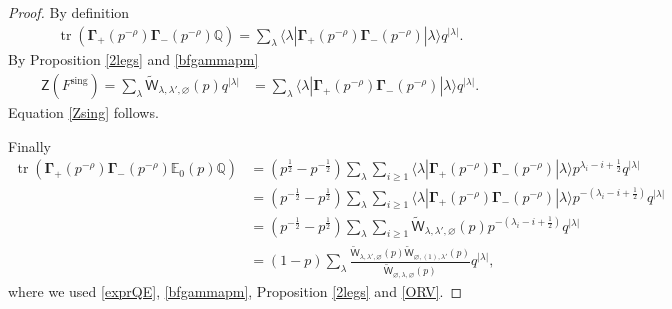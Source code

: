 \documentclass{amsart}
\theoremstyle{definition}
\newcommand{\QQ} {\mathbb{Q}}		%
\newcommand{\bfGamma} {\mathbf{\Gamma}}
\newcommand{\sing}{\mathrm{sing}}
\newcommand{\EE}{\mathbb{E}}
\newcommand{\sfW} {\mathsf{W}}
\newcommand{\sfZ} {\mathsf{Z}}
\newcommand{\tr}{\operatorname{tr}}
\begin{document}
\begin{proof}
By definition
\begin{align*}
\tr(\bfGamma_+(p^{-\rho}) \bfGamma_-(p^{-\rho}) \QQ) = \sum_\lambda \langle \lambda | \mathbf{\Gamma}_+(p^{-\rho}) \mathbf{\Gamma}_-(p^{-\rho}) | \lambda \rangle q^{|\lambda|}.
\end{align*}
By Proposition \ref{2legs} and \eqref{bfgammapm}
\begin{align*}
\sfZ(F^{\sing}) = \sum_\lambda \tilde{\sfW}_{\lambda,\lambda',\varnothing}(p) q^{|\lambda|} &= \sum_\lambda \langle \lambda | \mathbf{\Gamma}_+(p^{-\rho}) \mathbf{\Gamma}_-(p^{-\rho}) | \lambda \rangle q^{|\lambda|}.  %
\end{align*}
Equation \eqref{Zsing} follows. 

Finally 
\begin{align*}
\tr(\bfGamma_+(p^{-\rho}) \bfGamma_-(p^{-\rho}) \EE_0(p) \QQ) &= (p^{\frac{1}{2}} - p^{-\frac{1}{2}}) \sum_{\lambda} \sum_{i \geq 1} \langle \lambda | \bfGamma_+(p^{-\rho}) \bfGamma_-(p^{-\rho}) | \lambda \rangle p^{\lambda_i-i+\frac{1}{2}} q^{|\lambda|} \\
&= (p^{-\frac{1}{2}} - p^{\frac{1}{2}}) \sum_{\lambda} \sum_{i \geq 1} \langle \lambda | \bfGamma_+(p^{-\rho}) \bfGamma_-(p^{-\rho}) | \lambda \rangle p^{-(\lambda_i-i+\frac{1}{2})} q^{|\lambda|} \\
&= (p^{-\frac{1}{2}} - p^{\frac{1}{2}}) \sum_{\lambda} \sum_{i \geq 1} \tilde{\sfW}_{\lambda,\lambda',\varnothing}(p) p^{-(\lambda_i-i+\frac{1}{2})} q^{|\lambda|} \\
&= (1 - p) \sum_{\lambda} \frac{\tilde{\sfW}_{\lambda,\lambda',\varnothing}(p) \tilde{\sfW}_{\varnothing,(1),\lambda'}(p)}{\tilde{\sfW}_{\varnothing, \lambda, \varnothing}(p)} q^{|\lambda|},
\end{align*}
where we used \eqref{exprQE}, \eqref{bfgammapm}, Proposition \ref{2legs} and \eqref{ORV}.
\end{proof}
\end{document}
